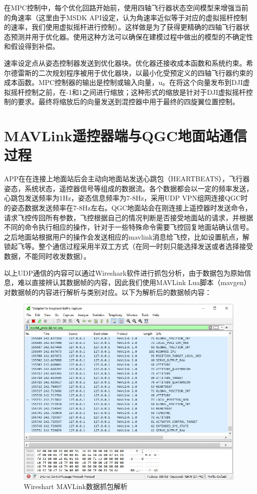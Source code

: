 在MPC控制中，每个优化回路开始前，使用四轴飞行器状态空间模型来增强当前的角速率（这里由于MSDK API设定，认为角速率近似等于对应的虚拟摇杆控制的速率，我们使用虚拟摇杆进行控制）。这样做是为了获得更精确的四轴飞行器状态预测并用于优化器。使用这种方法可以确保在建模过程中做出的模型的不确定性和假设得到补偿。

速率设定点从姿态控制器发送到优化器块。优化器还接收成本函数和系统约束。希尔德雷斯的二次规划程序被用于优化器块，以最小化受预定义的四轴飞行器约束的成本函数。MPC控制器的输出是控制或输入向量，u。在将这个向量发布到DJI虚拟摇杆控制之前，在-1和1之间进行缩放；这种形式的缩放是针对于DJI虚拟摇杆控制的要求。最终将缩放后的向量发送到混控器中用于最终的四旋翼位置控制。

\section{MAVLink遥控器端与QGC地面站通信过程}

APP在在连接上地面站后会主动向地面站发送心跳包（HEARTBEATS），飞行器姿态，系统状态，遥控器信号等组成的数据流。各个数据都会以一定的频率发送，心跳包发送频率为1Hz，姿态信息频率为7-8Hz，采用UDP VPN组网连接QGC时的姿态数据发送频率在7-8Hz左右。QGC地面站会在刚连接上遥控器时发送命令，请求飞控传回所有参数，飞控根据自己的情况判断是否接受地面站的请求，并根据不同的命令执行相应的操作，针对于一些特殊命令需要飞控回复地面站确认信号。之后地面站根据用户的操作会发送相应的mavlink消息给飞控，比如设置航点，解锁起飞等。整个通信过程采用半双工方式（在同一时刻只能选择发送或者选择接受数据，不能同时收发数据）。

以上UDP通信的内容可以通过Wireshark软件进行抓包分析，由于数据包为原始信息，难以直接辨认其数据帧的内容，因此我们使用MAVLink Lua脚本（mavgen）对数据帧的内容进行解析与类别对应。以下为解析后的数据帧内容：

\begin{figure}[ht]
  \centering
  \includegraphics[width=0.8\linewidth]{./Figure/Mavlink_Wireshark_Decode.jpg}
  \caption{Wireshart MAVLink数据抓包解析}\label{Fig:xd1}
\end{figure}

